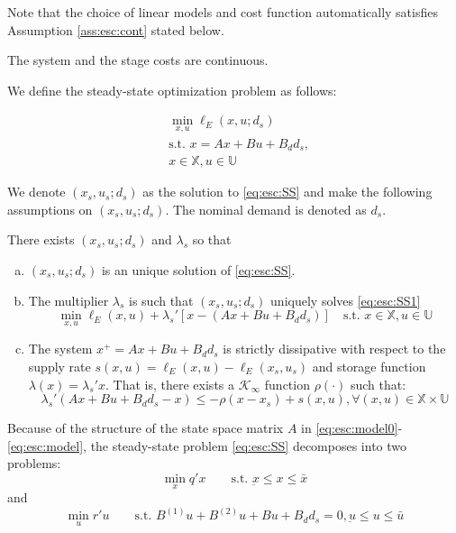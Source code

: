 Note that the choice of linear models and cost function automatically satisfies Assumption \ref{ass:esc:cont}
stated below.

\begin{assumption}[Continuity]
\label{ass:esc:cont}
The system and the stage costs are  continuous.
\end{assumption}

We define the steady-state optimization problem as follows:

\begin{align}
\label{eq:esc:SS}
&\min_{x,u}{\ell_E(x,u;d_s)}  \nonumber \\
 &\text{s.t.~} x = Ax+Bu+B_dd_s, \\
&x \in \mathbb{X}, u \in \mathbb{U} \nonumber
\end{align}

We denote $(x_s,u_s;d_s)$ as the solution to \eqref{eq:esc:SS} and make the
following assumptions on $(x_s,u_s;d_s)$. The nominal demand is
denoted as $d_s$.

\begin{assumption}
\label{ass:esc:strict_dissipativity}
There exists $(x_s,u_s;d_s)$ and $\lambda_s$ so that 
\begin{enumerate}[(a)]
\item $(x_s,u_s;d_s)$  is an unique solution of \eqref{eq:esc:SS}.
\item The multiplier $\lambda_s$ is such that $(x_s,u_s;d_s)$
  uniquely solves \eqref{eq:esc:SS1}
\begin{equation}
\label{eq:esc:SS1}
\min_{x,u}{\ell_E(x,u)+\lambda_s'[x-(Ax+Bu+B_dd_s)]} \quad \text{s.t.~}
  x \in \mathbb{X}, u \in \mathbb{U}
\end{equation}
\item The system $x^+=Ax+Bu+B_dd_s$ is strictly dissipative with respect
  to the supply rate $s(x,u) = \ell_E(x,u)-\ell_E(x_s,u_s)$ and
  storage function $\lambda(x) = \lambda_s'x$. That is, there exists a
  $\mathcal{K}_{\infty}$ function $\rho(\cdot)$ such that:
\begin{equation}
\label{eq:esc:strict_dissipativity}
\lambda_s'(Ax+Bu+B_dd_s-x) \leq -\rho (x-x_s)+s(x,u), \forall (x,u) \in
\mathbb{X} \times \mathbb{U}
\end{equation}
\end{enumerate}
\end{assumption}


Because of the structure of the state space matrix $A$ in \eqref{eq:esc:model0}-\eqref{eq:esc:model}, the steady-state
problem \eqref{eq:esc:SS} decomposes into two problems:
\begin{equation}
\label{eq:esc:SSx} \min_{x}{q'x} \qquad \text{s.t.~} \underbar{x} \leq x
\leq \bar{x}
\end{equation}
and
\begin{equation}
\label{eq:esc:SSu} \min_{u}{r'u} \qquad \text{s.t.~} B^{(1)}u + B^{(2)}u +
Bu + B_dd_s = 0,
 \underbar{u} \leq u\leq \bar{u}
\end{equation}

